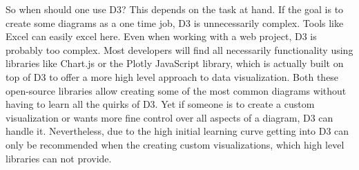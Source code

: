 So when should one use D3? This depends on the task at hand. If the goal is to create some diagrams as a one time job, D3 is unnecessarily complex. Tools like Excel can easily excel here. Even when working with a web project, D3 is probably too complex. Most developers will find all necessarily functionality using libraries like Chart.js\cite{chartjs} or the Plotly JavaScript library, which is actually built on top of D3 to offer a more high level approach to data visualization. Both these open-source libraries allow creating some of the most common diagrams without having to learn all the quirks of D3.
Yet if someone is to create a custom visualization or wants more fine control over all aspects of a diagram, D3 can handle it.
Nevertheless, due to the high initial learning curve getting into D3 can only be recommended when the creating custom visualizations, which high level libraries can not provide.
